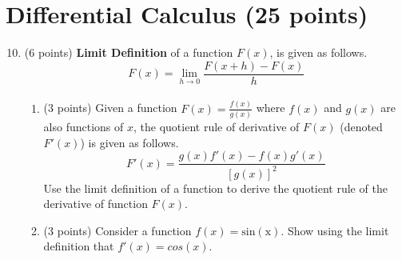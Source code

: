 \documentclass{article}%
\begin{document}
\section*{Differential Calculus (25 points)}
\begin{enumerate}
    \setcounter{enumi}{9}
    \item (6 points) \textbf{Limit Definition} of a function $F(x)$, is given as follows.
    \begin{equation*}
        F(x) = \lim\limits_{h\xrightarrow[]{} 0}\frac{F(x+h) - F(x)}{h}
    \end{equation*}
    \begin{enumerate}
    \item (3 points) Given a function $F(x) = \frac{f(x)}{g(x)}$ where $f(x)$ and $g(x)$ are also functions of $x$, the quotient rule of derivative of $F(x)$ (denoted $F'(x)$) is given as follows. 
    \begin{equation*}
        F'(x) = \frac{g(x)f'(x) - f(x)g'(x)}{[g(x)]^2}
    \end{equation*}
    Use the limit definition of a function to derive the quotient rule of the derivative of function $F(x)$.\vspace{2ex}
    \item (3 points) Consider a function $f(x) = \mathrm{sin(x)}$. Show using the limit definition that $f'(x)= cos(x)$.
\end{enumerate}


\end{enumerate}
\end{document}
